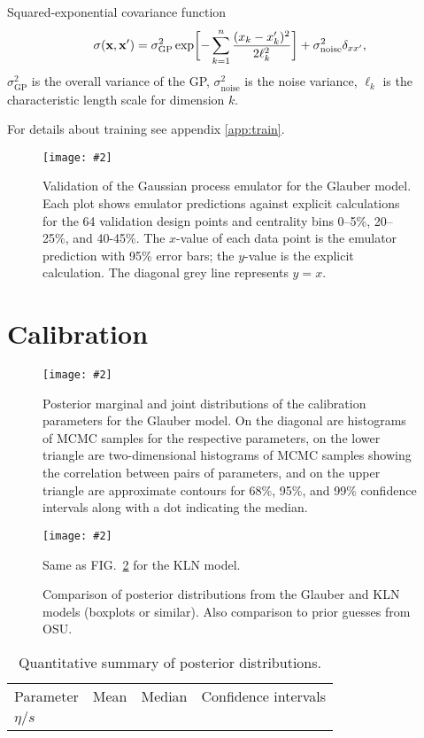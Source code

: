 \documentclass[aps,prc,reprint,amsmath]{revtex4-1}
\newcommand{\widefig}[3][t]{
  \begin{figure*}[#1]
    \texttt{[image: \#2]}
    \caption{\label{fig:#2}#3}
  \end{figure*}
}
\newcommand{\placeholderfig}[3][t]{
  \begin{figure}[#1]
    \centering
    \framebox{\parbox[c][.5\columnwidth]{\columnwidth}{
      placeholder
    }}
    \caption{\label{fig:#2}#3}
  \end{figure}
}
\begin{document}
Squared-exponential covariance function
\begin{equation}
  \sigma(\mathbf x, \mathbf x') = \sigma_\text{GP}^2 \exp\biggl[ -\sum_{k=1}^n \frac{(x_k - x'_k)^2}{2\ell_k^2} \biggr] + \sigma_\text{noise}^2\delta_{xx'},
\end{equation}
$\sigma_\text{GP}^2$ is the overall variance of the GP,
$\sigma_\text{noise}^2$ is the noise variance,
$\ell_k$ is the characteristic length scale for dimension $k$.

For details about training see appendix \ref{app:train}.

\widefig{validation_glb}{
  Validation of the Gaussian process emulator for the Glauber model.
  Each plot shows emulator predictions against explicit calculations for the 64 validation design points and centrality bins 0--5\%, 20--25\%, and 40-45\%.
  The $x$-value of each data point is the emulator prediction with 95\% error bars; the $y$-value is the explicit calculation.
  The diagonal grey line represents $y = x$.
}


\section{Calibration}

\cite{Abelev:2014mda}
\cite{Shen:2011zc, Heinz:2011kt}

\widefig{calibration_posterior_glb}{
  Posterior marginal and joint distributions of the calibration parameters for the Glauber model.
  On the diagonal are histograms of MCMC samples for the respective parameters,
  on the lower triangle are two-dimensional histograms of MCMC samples showing the correlation between pairs of parameters,
  and on the upper triangle are approximate contours for 68\%, 95\%, and 99\% confidence intervals along with a dot indicating the median.
}

\widefig{calibration_posterior_kln}{
  Same as FIG.~\ref{fig:calibration_posterior_glb} for the KLN model.
}

\placeholderfig{posterior_comparison}{
  Comparison of posterior distributions from the Glauber and KLN models (boxplots or similar).
  Also comparison to prior guesses from OSU.
}

\begin{table}[b]
  \caption{
    \label{tab:posterior}
    Quantitative summary of posterior distributions.
  }
  \begin{ruledtabular}
  \begin{tabular}{llll}
    Parameter & Mean & Median & Confidence intervals \\
    $\eta/s$ & & & \\
  \end{tabular}
  \end{ruledtabular}
\end{table}
\end{document}
